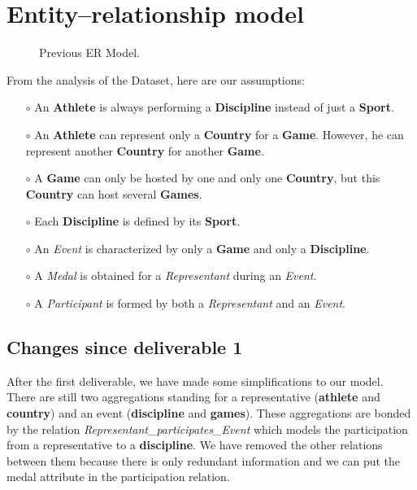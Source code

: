 %
%
%
%

\chapter{Entity–relationship model}

\begin{figure}[h!]
	\centering
	\caption{Previous ER Model.\label{fig:er-model-old}}
\end{figure}

From the analysis of the Dataset, here are our assumptions:

\begin{itemize}
	\item[$\circ$] An \textbf{Athlete} is always performing a \textbf{Discipline} instead of just a \textbf{Sport}.
	\item[$\circ$] An \textbf{Athlete} can represent only a \textbf{Country} for a \textbf{Game}. However, he can represent another \textbf{Country} for another \textbf{Game}.
	\item[$\circ$] A \textbf{Game} can only be hosted by one and only one \textbf{Country}, but this \textbf{Country} can host several \textbf{Games}.
	\item[$\circ$] Each \textbf{Discipline} is defined by its \textbf{Sport}.
	\item[$\circ$] An \textit{Event} is characterized by only a \textbf{Game} and only a \textbf{Discipline}.
	\item[$\circ$] A \textit{Medal} is obtained for a \textit{Representant} during an \textit{Event}.
	\item[$\circ$] A \textit{Participant} is formed by both a \textit{Representant} and an \textit{Event}.
\end{itemize}

\section*{Changes since deliverable 1}
After the first deliverable, we have made some simplifications to our model.
There are still two aggregations standing for a representative (\textbf{athlete} and \textbf{country}) and an event (\textbf{discipline} and \textbf{games}). These aggregations are bonded by the relation \textit{Representant\_participates\_Event} which models the participation from a representative to a \textbf{discipline}.
We have removed the other relations between them because there is only redundant information and we can put the medal attribute in the participation relation.

